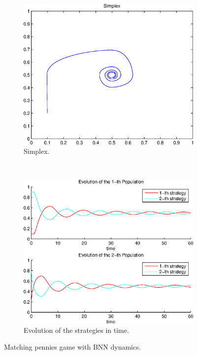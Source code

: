 \documentclass[a4paper,10pt]{article}
\begin{document}
\begin{figure}[h]
  \centering
  \begin{subfigure}[b]{0.45\textwidth}
	  \includegraphics[width=\textwidth]{./images/test2_simplex_bnn.eps}
	  \caption{Simplex.}
	  \label{fig:test2_simplex_bnn}
  \end{subfigure}
  ~ 
  \begin{subfigure}[b]{0.45\textwidth}
	  \includegraphics[width=\textwidth]{./images/test2_ev_bnn.eps}
	  \caption{Evolution of the strategies in time.}
	  \label{fig:test2_ev_bnn}
  \end{subfigure}
  \caption{Matching pennies game with BNN dynamics.}
  \label{fig:mp_game_bnn}
\end{figure}
\end{document}
